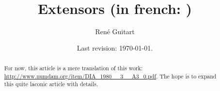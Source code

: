 



\title{Extensors (in french: )}
\author{\textfrench{René Guitart}}
\date{Last revision: \today{}.}



\maketitle

\begin{abstract}
For now, this article is a mere translation of this work: \url{http://www.numdam.org/item/DIA_1980__3__A3_0.pdf}. The hope is to expand this quite laconic article with details.
\end{abstract}

\tableofcontents







